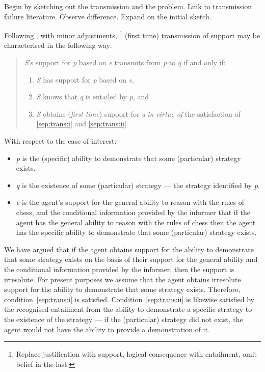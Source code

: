 \documentclass[10pt]{article}
\begin{document}
\begin{note}
  Begin by sketching out the transmission and the problem.
  Link to transmission failure literature.
  Observe difference.
  Expand on the initial sketch.
\end{note}

\begin{note}
  Following \cite{Moretti:2018we}, with minor adjustments,\nolinebreak
  \footnote{
    Replace justification with support, logical consequence with entailment, omit belief in the last.
  }
  (first time) transmission of support may be characterised in the following way:
  \begin{quote}
    \emph{S}'s support for \emph{p} based on \emph{e} transmits from \emph{p} to \emph{q} if and only if:
    \begin{enumerate}[label=(\roman*), ref=(\roman*)]
    \item\label{sep:trans:i} \emph{S} has support for \emph{p} based on \emph{e},
    \item\label{sep:trans:ii} \emph{S} knows that \emph{q} is entailed by \emph{p}, and
    \item\label{sep:trans:iii} \emph{S} obtains (\emph{first time}) support for \emph{q} \emph{in virtue of} the satisfaction of \ref{sep:trans:i} and \ref{sep:trans:ii}.
    \end{enumerate}
  \end{quote}
  With respect to the case of interest:
  \begin{itemize}
  \item \emph{p} is the (specific) ability to demonstrate that some (particular) strategy exists.
  \item \emph{q} is the existence of some (particular) strategy --- the strategy identified by \emph{p}.
  \item \emph{e} is the agent's support for the general ability to reason with the rules of chess, and the conditional information provided by the informer that if the agent has the general ability to reason with the rules of chess then the agent has the specific ability to demonstrate that some (particular) strategy exists.
  \end{itemize}
  We have argued that if the agent obtains support for the ability to demonstrate that some strategy exists on the basis of their support for the general ability and the conditional information provided by the informer, then the support is irresolute.
  For present purposes we assume that the agent obtains irresolute support for the ability to demonstrate that some strategy exists.
  Therefore, condition~\ref{sep:trans:i} is satisfied.
  Condition~\ref{sep:trans:ii} is likewise satisfied by the recognised entailment from the ability to demonstrate a specific strategy to the existence of the strategy --- if the (particular) strategy did not exist, the agent would not have the ability to provide a demonstration of it.


\end{note}
\end{document}
